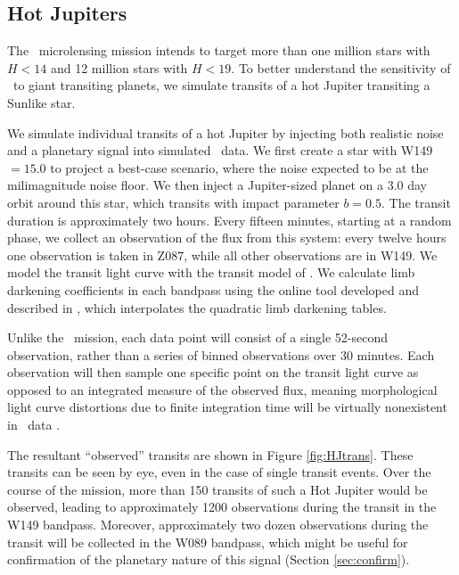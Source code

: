 \subsection{Hot Jupiters}
\label{sec:HJ}

The \WF\ microlensing mission intends to target more than one million stars
with $H < 14$ and 12 million stars with $H < 19$. To better understand the 
sensitivity of \WF\ to giant transiting planets, we simulate transits of a hot Jupiter
transiting a Sunlike star. 

We simulate individual transits of a hot Jupiter by injecting both realistic noise
and a planetary signal into simulated \WF\ data. We first create a star with
W149 $= 15.0$ to project a best-case scenario, where the noise expected to be at
the milimagnitude noise floor.
We then inject a Jupiter-sized planet on a 3.0 day orbit around this star,
which transits with impact parameter $b = 0.5$. 
The transit duration is approximately two hours.
Every fifteen minutes, starting at a random phase, we collect an observation
of the flux from this system: every twelve hours one observation is taken in 
Z087, while all other observations are in W149. 
We model the transit light curve with the transit model of \citet{Mandel02}. 
We calculate limb darkening coefficients in each bandpass using the online tool
developed and described in \citet{Eastman13}, which interpolates the 
\citet{Claret11} quadratic limb darkening tables. 

Unlike the \kep\ mission, each data point will consist of a single 
52-second observation, rather than a series of binned observations over 30 minutes.
Each observation will then sample one specific point on the transit light curve
as opposed to an integrated measure of the observed flux, meaning morphological
light curve distortions due to finite integration time will be virtually nonexistent in
\WF\ data \citep{Kipping10}.

The resultant ``observed'' transits are shown in Figure \ref{fig:HJtrans}.
These transits can be seen by eye, even in the case of single transit events.
Over the course of the mission, more than 150 transits of such a Hot Jupiter would be observed, leading
to approximately 1200 observations during the transit in the W149 bandpass.
Moreover, approximately two dozen observations during the transit will be collected
in the W089 bandpass, which might be useful for confirmation of the planetary 
nature of this signal (Section \ref{sec:confirm}).


